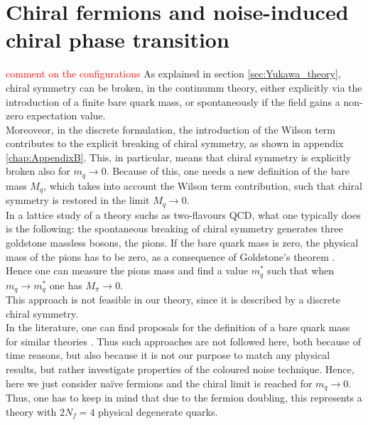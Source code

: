 \section{Chiral fermions and noise-induced chiral phase transition}
\label{sec:chiral_PT}
\textcolor{red}{comment on the configurations}
As explained in section \ref{sec:Yukawa_theory}, chiral symmetry can be broken, in the continumm theory, either explicitly via the introduction of a finite bare quark mass, or spontaneously if the field gains a non-zero expectation value.\\
Moreoveor, in the discrete formulation, the introduction of the Wilson term contributes to the explicit breaking of chiral symmetry, as shown in appendix \ref{chap:AppendixB}. This, in particular, means that chiral symmetry is explicitly broken also for $m_q \to 0$. Because of this, one needs a new definition of the bare mass $M_q$, which takes into account the Wilson term contribution, such that chiral symmetry is restored in the limit $M_q \to 0$. \\
In a lattice study of a theory suchs as  two-flavours QCD, what one typically does \cite{rothe_LGT,gattringer_LQCD} is the following: the spontaneous breaking of chiral symmetry generates three goldstone massless bosons, the pions. If the bare quark mass is zero, the physical mass of the pions has to be zero, as a consequence of Goldstone's theorem \cite{goldstone}. Hence one can measure the pions mass and find a value $m_q^*$ such that when $m_q \to m_q^*$ one has $M_\pi \to 0$. \\
This approach is not feasible in our theory, since it is described by a discrete chiral symmetry. \\
In the literature, one can find proposals for the definition of a bare quark mass for similar theories \cite{Iwasaki:1994gq,MAIANI1986265}. Thus such approaches are not followed here, both because of time reasons, but also because it is not our purpose to match any physical results, but rather investigate properties of the coloured noise technique. Hence, here we just consider na\"ive fermions and the chiral limit is reached for $m_q \to 0$. Thus, one has to keep in mind that due to the fermion doubling, this represents a theory with $2N_f = 4$ physical degenerate quarks. \\~\\
